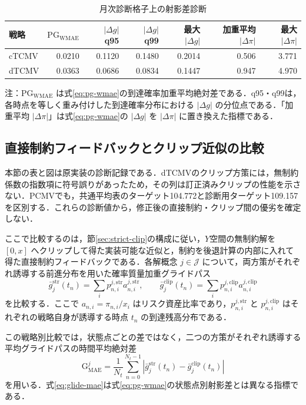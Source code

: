 \documentclass[10pt,a4paper]{article}
\theoremstyle{plain}
\theoremstyle{definition}
\begin{document}
\begin{table}[htbp]
\centering
\caption{月次診断格子上の射影差診断}
\label{tab:tcmv-projection-gap}
\begin{tabular}{lrrrrrr}
\toprule
戦略 & $\mathrm{PG}_{\mathrm{WMAE}}$ & $|\Delta g|$ q95 & $|\Delta g|$ q99 & 最大 $|\Delta g|$ & 加重平均 $|\Delta\pi|$ & 最大 $|\Delta\pi|$ \\
\midrule
cTCMV & 0.0210 & 0.1120 & 0.1480 & 0.2014 & 0.506 & 3.771 \\
dTCMV & 0.0363 & 0.0686 & 0.0834 & 0.1447 & 0.947 & 4.970 \\
\bottomrule
\end{tabular}
\begin{flushleft}
\footnotesize 注：$\mathrm{PG}_{\mathrm{WMAE}}$ は式\eqref{eq:pg-wmae}の到達確率加重平均絶対差である．q95・q99は，各時点を等しく重み付けした到達確率分布における $|\Delta g|$ の分位点である．「加重平均 $|\Delta\pi|$」は式\eqref{eq:pg-wmae}の $|\Delta g|$ を $|\Delta\pi|$ に置き換えた指標である．
\end{flushleft}
\end{table}

\subsection{直接制約フィードバックとクリップ近似の比較}\label{sec:strict-clip-results}
本節の表と図は原実装の診断記録である．dTCMVのクリップ方策には，無制約係数の指数項に符号誤りがあったため，その列は訂正済みクリップの性能を示さない．PCMVでも，共通平均表のターゲット104.772と診断用ターゲット109.157を区別する．これらの診断値から，修正後の直接制約・クリップ間の優劣を確定しない．


ここで比較するのは，節\ref{sec:strict-clip}の構成に従い，$Y$空間の無制約解を $[0,x]$ へクリップして得た実装可能な近似と，制約を後退計算の内部に入れて得た直接制約フィードバックである．各解概念 $j\in\mathcal J$ について，両方策がそれぞれ誘導する前進分布を用いた確率質量加重グライドパス
\[
  \bar g_j^{\mathrm{str}}(t_n)=\sum_i p_{n,i}^{j,\mathrm{str}}a_{n,i}^{j,\mathrm{str}},
  \qquad
  \bar g_j^{\mathrm{clip}}(t_n)=\sum_i p_{n,i}^{j,\mathrm{clip}}a_{n,i}^{j,\mathrm{clip}}
\]
を比較する．ここで $a_{n,i}=\pi_{n,i}/x_i$ はリスク資産比率であり，$p_{n,i}^{j,\mathrm{str}}$ と $p_{n,i}^{j,\mathrm{clip}}$ はそれぞれの戦略自身が誘導する時点 $t_n$ の到達残高分布である．

この戦略別比較では，状態点ごとの差ではなく，二つの方策がそれぞれ誘導する平均グライドパスの時間平均絶対差
\begin{equation}
  \mathrm{G}_{\mathrm{MAE}}^{j}
  =\frac{1}{N_t}\sum_{n=0}^{N_t-1}
  \left|\bar g_j^{\mathrm{str}}(t_n)-\bar g_j^{\mathrm{clip}}(t_n)\right|
  \label{eq:glide-mae}
\end{equation}
を用いる．式\eqref{eq:glide-mae}は式\eqref{eq:pg-wmae}の状態点別射影差とは異なる指標である．
\end{document}
